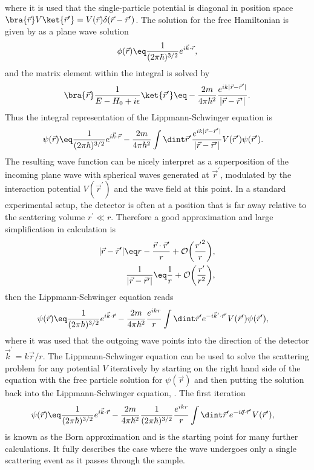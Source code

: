 \documentclass[\main/dresen_thesis.tex]{subfiles}
\begin{document}
where it is used that the single-particle potential is diagonal in position space $\bra{\vec{r}} V \ket{\vec{r}^\prime} = V(\vec{r}) \delta(\vec{r} - \vec{r}^\prime)$. 
The solution for the free Hamiltonian is given by as a plane wave solution
\begin{align}
  \phi(\vec{r}) \eq \frac{1}{(2\pi\hbar)^{3/2}} e^{i\vec{k} \cdot \vec{r}},
\end{align}
and the matrix element within the integral is solved by
\begin{align}
  \bra{\vec{r}}\frac{1}{E - H_0 + i \epsilon} \ket{\vec{r}^\prime} \eq -\frac{2m}{4 \pi \hbar^2} \frac{e^{ik|\vec{r} - \vec{r}^\prime|}}{|\vec{r} - \vec{r}^\prime|}.
\end{align}
Thus the integral representation of the Lippmann-Schwinger equation is
\begin{align}
  \psi (\vec{r}) &\eq \frac{1}{(2\pi\hbar)^{3/2}} e^{i\vec{k} \cdot \vec{r}} - \frac{2m}{4 \pi\hbar^2} \int \dint \vec{r}^\prime \frac{e^{ik|\vec{r} - \vec{r}^\prime|}}{|\vec{r} - \vec{r}^\prime|} V (\vec{r}^\prime)\psi (\vec{r}^\prime).
\end{align}
The resulting wave function can be nicely interpret as a superposition of the incoming plane wave with spherical waves generated at $\vec{r}^\prime$, modulated by the interaction potential $V(\vec{r}^\prime)$ and the wave field at this point.
In a standard experimental setup, the detector is often at a position that is far away relative to the scattering volume $r^\prime \ll r$. 
Therefore a good approximation and large simplification in calculation is
\begin{align}
  |\vec{r} - \vec{r}^\prime| \eq r - \frac{\vec{r} \cdot \vec{r}^\prime}{r} + \mathcal{O}\bigg(\frac{{r^\prime}^2}{r}\bigg),\\
  \frac{1}{|\vec{r} - \vec{r}^\prime|} \eq \frac{1}{r} + \mathcal{O}\bigg(\frac{r^\prime}{r^2} \bigg),
\end{align}
then the Lippmann-Schwinger equation reads
\begin{align}
  \psi (\vec{r}) &\eq \frac{1}{(2\pi\hbar)^{3/2}} e^{i\vec{k} \cdot \vec{r}} - \frac{2m}{4 \pi\hbar^2} \frac{e^{ikr}}{r} \int \dint \vec{r}^\prime e^{-i\vec{k}^\prime \cdot \vec{r}^\prime} V (\vec{r}^\prime)\psi (\vec{r}^\prime),
\end{align}
where it was used that the outgoing wave points into the direction of the detector  $\vec{k}^\prime = k \vec{r} / r$.
The Lippmann-Schwinger equation can be used to solve the scattering problem for any potential $V$ iteratively by starting on the right hand side of the equation with the free particle solution for $\psi (\vec{r})$ and then putting the solution back into the Lippmann-Schwinger equation, \etc.
The first iteration 
\begin{align}
  \psi (\vec{r}) &\eq \frac{1}{(2\pi\hbar)^{3/2}} e^{i\vec{k} \cdot \vec{r}} - \frac{2m}{4 \pi\hbar^2} \frac{1}{(2\pi\hbar)^{3/2}} \frac{e^{ikr}}{r} \int \dint \vec{r}^\prime e^{-i\vec{q} \cdot \vec{r}^\prime} V (\vec{r}^\prime),
\end{align}
is known as the Born approximation and is the starting point for many further calculations. It fully describes the case where the wave undergoes only a single scattering event as it passes through the sample. 
\end{document}
